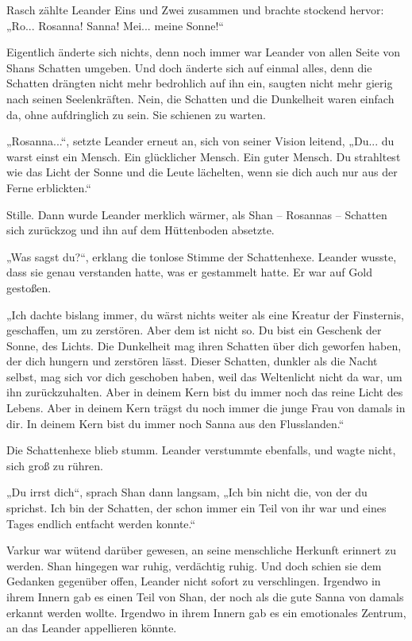 \documentclass[10pt, a4paper, oneside]{book}
\begin{document}
Rasch zählte Leander Eins und Zwei zusammen und brachte stockend hervor: „Ro... Rosanna! Sanna! Mei... meine Sonne!“

Eigentlich änderte sich nichts, denn noch immer war Leander von allen Seite von Shans Schatten umgeben. Und doch änderte sich auf einmal alles, denn die Schatten drängten nicht mehr bedrohlich auf ihn ein, saugten nicht mehr gierig nach seinen Seelenkräften. Nein, die Schatten und die Dunkelheit waren einfach da, ohne aufdringlich zu sein. Sie schienen zu warten.

„Rosanna...“, setzte Leander erneut an, sich von seiner Vision leitend, „Du... du warst einst ein Mensch. Ein glücklicher Mensch. Ein guter Mensch. Du strahltest wie das Licht der Sonne und die Leute lächelten, wenn sie dich auch nur aus der Ferne erblickten.“

Stille. Dann wurde Leander merklich wärmer, als Shan – Rosannas – Schatten sich zurückzog und ihn auf dem Hüttenboden absetzte.

„Was sagst du?“, erklang die tonlose Stimme der Schattenhexe. Leander wusste, dass sie genau verstanden hatte, was er gestammelt hatte. Er war auf Gold gestoßen.

„Ich dachte bislang immer, du wärst nichts weiter als eine Kreatur der Finsternis, geschaffen, um zu zerstören. Aber dem ist nicht so. Du bist ein Geschenk der Sonne, des Lichts. Die Dunkelheit mag ihren Schatten über dich geworfen haben, der dich hungern und zerstören lässt. Dieser Schatten, dunkler als die Nacht selbst, mag sich vor dich geschoben haben, weil das Weltenlicht nicht da war, um ihn zurückzuhalten. Aber in deinem Kern bist du immer noch das reine Licht des Lebens. Aber in deinem Kern trägst du noch immer die junge Frau von damals in dir. In deinem Kern bist du immer noch Sanna aus den Flusslanden.“

Die Schattenhexe blieb stumm. Leander verstummte ebenfalls, und wagte nicht, sich groß zu rühren.

„Du irrst dich“, sprach Shan dann langsam, „Ich bin nicht die, von der du sprichst. Ich bin der Schatten, der schon immer ein Teil von ihr war und eines Tages endlich entfacht werden konnte.“

Varkur war wütend darüber gewesen, an seine menschliche Herkunft erinnert zu werden. Shan hingegen war ruhig, verdächtig ruhig. Und doch schien sie dem Gedanken gegenüber offen, Leander nicht sofort zu verschlingen. Irgendwo in ihrem Innern gab es einen Teil von Shan, der noch als die gute Sanna von damals erkannt werden wollte. Irgendwo in ihrem Innern gab es ein emotionales Zentrum, an das Leander appellieren könnte.
\end{document}

